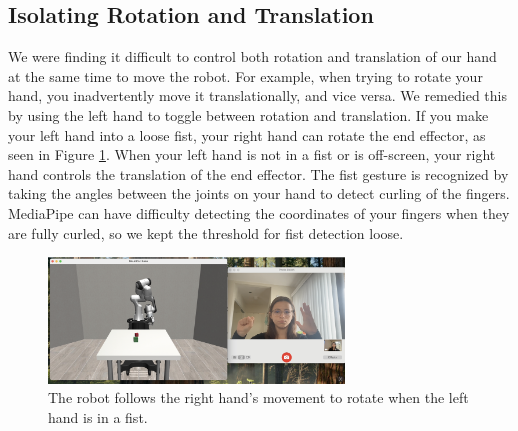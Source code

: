 \documentclass{article}
\begin{document}
\subsection{Isolating Rotation and Translation}
We were finding it difficult to control both rotation and translation of our
hand at the same time to move the robot. For example, when trying to rotate
your hand, you inadvertently move it translationally, and vice versa. We
remedied this by using the left hand to toggle between rotation and
translation. If you make your left hand into a loose fist, your right hand can
rotate the end effector, as seen in Figure \ref{fig:fist-rotation}. When your
left hand is not in a fist or is off-screen, your right hand controls the
translation of the end effector. The fist gesture is recognized by taking the
angles between the joints on your hand to detect curling of the fingers.
MediaPipe can have difficulty detecting the coordinates of your fingers when
they are fully curled, so we kept the threshold for fist detection loose. 
\begin{figure}[H]
  \centering
  \includegraphics[width=0.7\textwidth]{../assets/fist-rotation.png}
  \caption{The robot follows the right hand's movement to rotate when the left hand is in a fist. }
  \label{fig:fist-rotation}
\end{figure}

\end{document}
